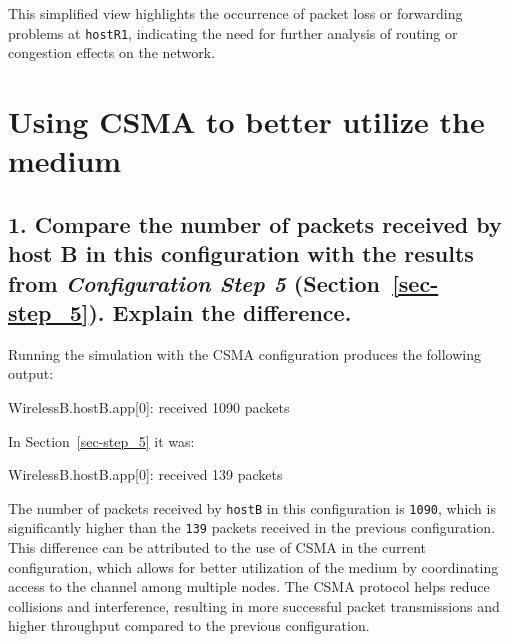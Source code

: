 \documentclass[
  letterpaper,
  DIV=11,
  numbers=noendperiod]{scrartcl}
\newenvironment{Shaded}{\begin{snugshade}}{\end{snugshade}}
\newcommand{\NormalTok}[1]{\textcolor[rgb]{0.00,0.23,0.31}{#1}}
\begin{document}
This simplified view highlights the occurrence of packet loss or
forwarding problems at \texttt{hostR1}, indicating the need for further
analysis of routing or congestion effects on the network.

\section{Using CSMA to better utilize the medium}\label{sec-step_6}

\subsection{\texorpdfstring{1. Compare the number of packets received by
host B in this configuration with the results from \emph{Configuration
Step 5} (Section~\ref{sec-step_5}). Explain the
difference.}{1. Compare the number of packets received by host B in this configuration with the results from Configuration Step 5 (Section~). Explain the difference.}}\label{compare-the-number-of-packets-received-by-host-b-in-this-configuration-with-the-results-from-configuration-step-5-sec-step_5.-explain-the-difference.}

Running the simulation with the CSMA configuration produces the
following output:

\begin{Shaded}
\begin{Highlighting}[]
\NormalTok{WirelessB.hostB.app[0]:}
\NormalTok{  received 1090 packets}
\end{Highlighting}
\end{Shaded}

In Section~\ref{sec-step_5} it was:

\begin{Shaded}
\begin{Highlighting}[]
\NormalTok{WirelessB.hostB.app[0]:}
\NormalTok{  received 139 packets}
\end{Highlighting}
\end{Shaded}

The number of packets received by \texttt{hostB} in this configuration
is \texttt{1090}, which is significantly higher than the \texttt{139}
packets received in the previous configuration. This difference can be
attributed to the use of CSMA in the current configuration, which allows
for better utilization of the medium by coordinating access to the
channel among multiple nodes. The CSMA protocol helps reduce collisions
and interference, resulting in more successful packet transmissions and
higher throughput compared to the previous configuration.
\end{document}
